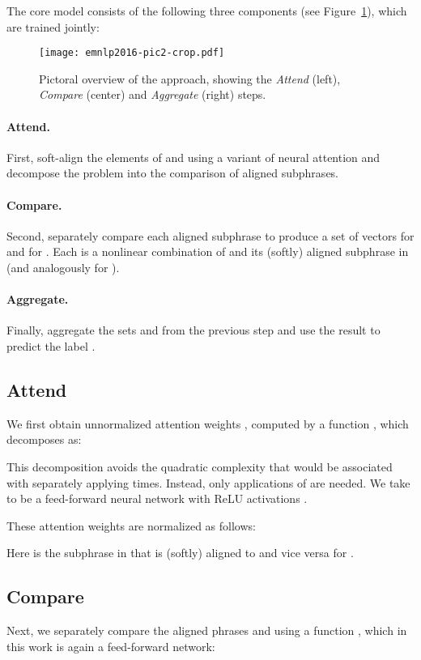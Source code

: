 \documentclass[11pt,letterpaper]{article}
\begin{document}
The core model consists of the following three components (see Figure~\ref{fig:overview}), which are trained jointly:

\begin{figure}[!tbp]
\texttt{[image: emnlp2016-pic2-crop.pdf]}
\caption{Pictoral overview of the approach, showing the \emph{Attend} (left), \emph{Compare} (center) and \emph{Aggregate} (right) steps.}
\label{fig:overview}
\vspace{-0.3cm}
\end{figure}


\paragraph{Attend.} First, soft-align the elements of  and  using a variant of neural attention \cite{bahdanau2014neural} and decompose the problem into the comparison of aligned subphrases.

\paragraph{Compare.} Second, separately compare each aligned subphrase to produce a set of vectors  for  and
 for .
Each  is a nonlinear combination of  and its (softly) aligned subphrase in 
(and analogously for ).

\paragraph{Aggregate.} Finally, aggregate the sets  and  from the previous step and use the result to predict the label .

\subsection{Attend}
We first obtain unnormalized attention weights , computed by a function , which decomposes as:

This decomposition avoids the quadratic complexity that would be associated with
separately applying   times. Instead, only  applications of  are needed.
We take  to be a feed-forward neural network with ReLU activations \cite{glorot2011deep}.

These attention weights are normalized as follows:

Here  is the subphrase in  that is (softly) aligned to  and vice versa for .


\subsection{Compare}
Next, we separately compare the aligned phrases  and  using a function , which in this work is again a feed-forward network:
\end{document}
